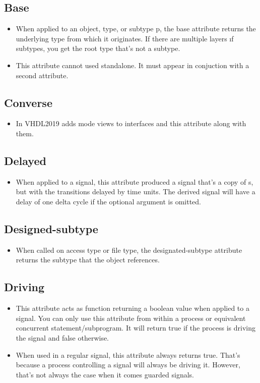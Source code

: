 \documentclass[a4paper,12pt]{article}
\begin{document}
	\subsection*{Base}
	\begin{itemize}
		\item When applied to an object, type, or subtype p, the base attribute returns the underlying type from which it originates. If there are multiple layers ıf subtypes, you get the root type that's not a subtype.
		\item This attribute cannot used standalone. It must appear in conjuction with a second attribute.
	\end{itemize}
	
	\subsection*{Converse}
	\begin{itemize}
		\item In VHDL2019 adds mode views to interfaces and this attribute along with them.
	\end{itemize}
	
	\subsection*{Delayed}
	\begin{itemize}
		\item When applied to a signal, this attribute produced a signal that's a copy of s, but with the transitions delayed by time units. The derived signal will have a delay of one delta cycle if the optional argument is omitted.
	\end{itemize}
	
	\subsection*{Designed-subtype}
	\begin{itemize}
		\item When called on access type or file type, the designated-subtype attribute returns the subtype that the object references.
	\end{itemize}
	
	\subsection*{Driving}
	\begin{itemize}
		\item This attribute acts as function returning a boolean value when applied to a signal. You can only use this attribute from within a process or equivalent concurrent statement/subprogram. It will return true if the process is driving the signal and false otherwise.
		\item When used in a regular signal, this attribute always returns true. That's because a process controlling a signal will always be driving it. However, that's not always the case when it comes guarded signals.
	\end{itemize}
	
\end{document}
